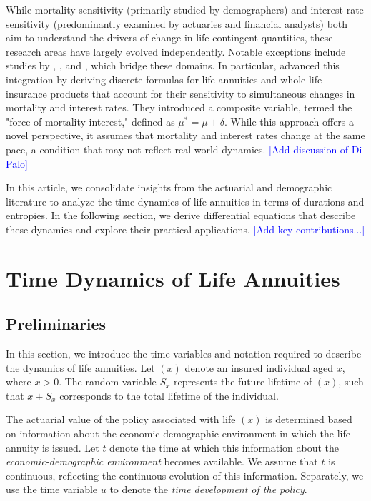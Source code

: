 \documentclass[12pt]{article}
\newcommand{\note}[1]{\textcolor{blue}{[#1]}}
\begin{document}
While mortality sensitivity (primarily studied by demographers) and interest rate sensitivity (predominantly examined by actuaries and financial analysts) both aim to understand the drivers of change in life-contingent quantities, these research areas have largely evolved independently. Notable exceptions include studies by \citet{Haberman2011}, \citet{rabitti2020mortality}, \citet{alvarez2021linking} and \citet{di2025decomposing}, which bridge these domains. In particular, \citet{Lin2020} advanced this integration by deriving discrete formulas for life annuities and whole life insurance products that account for their sensitivity to simultaneous changes in mortality and interest rates. They introduced a composite variable, termed the "force of mortality-interest," defined as $\mu^* = \mu + \delta$. While this approach offers a novel perspective, it assumes that mortality and interest rates change at the same pace, a condition that may not reflect real-world dynamics. \note{Add discussion of Di Palo}


In this article, we consolidate insights from the actuarial and demographic literature to analyze the time dynamics of life annuities in terms of durations and entropies. In the following section, we derive differential equations that describe these dynamics and explore their practical applications. \note{Add key contributions...}


\section{Time Dynamics of Life Annuities}\label{sec:TimeDynamics}
\subsection{Preliminaries}\label{preliminaries}

In this section, we introduce the time variables and notation required to describe the dynamics of life annuities. Let $(x)$ denote an insured individual aged $x$, where $x > 0$. The random variable \( S_x \) represents the future lifetime of $(x)$, such that \( x + S_x \) corresponds to the total lifetime of the individual. 

The actuarial value of the policy associated with life $(x)$ is determined based on information about the economic-demographic environment in which the life annuity is issued. Let \(t\) denote the  time at which this information about the \textit{economic-demographic environment} becomes available. We assume that \(t\) is continuous, reflecting the continuous evolution of this information. Separately, we use  the time variable \(u\) to denote the \textit{time development of the policy}.
\end{document}
